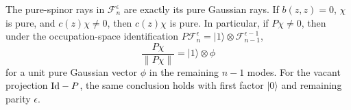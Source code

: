 \begin{lemma}
\label{spin:gaussian-closure}
The pure-spinor rays in $\mathcal F_n^\epsilon$ are exactly its pure
Gaussian rays.  If $b(z,z)=0$, $\chi$ is pure, and $c(z)\chi\ne0$,
then $c(z)\chi$ is pure.  In particular, if $P\chi\ne0$, then under
the occupation-space identification
$P\mathcal F_n^\epsilon=|1\rangle\otimes\mathcal F_{n-1}^{\epsilon-1}$,
\begin{equation}
 \frac{P\chi}{\|P\chi\|}=|1\rangle\otimes\phi
 \label{spin:occupied-closure}
\end{equation}
for a unit pure Gaussian vector $\phi$ in the remaining $n-1$ modes.
For the vacant projection $\mathrm{Id}-P$, the same conclusion holds with
first factor $|0\rangle$ and remaining parity $\epsilon$.
\end{lemma}
